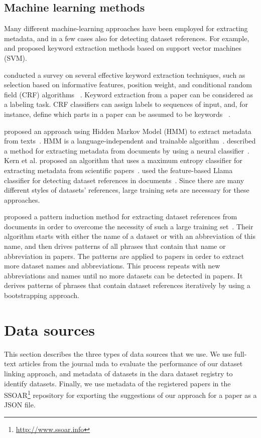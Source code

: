 \documentclass{IOS-Book-Article}
\newcommand{\dara}{\textsf{da\textbar ra}}
\begin{document}
\subsection{Machine learning methods}
Many different machine-learning approaches have been employed for extracting metadata, and in a few cases also for detecting dataset references. For example, \citeauthor{Zhang2006} \citeyearpar{Zhang2006} and \citeauthor{Han2003} \citeyearpar{Han2003} proposed keyword extraction methods based on support vector machines (SVM). 

\citeauthor{Kaur2010} conducted a survey on several effective keyword extraction techniques, such as selection based on informative features, position weight, and conditional random field (CRF) algorithms ~\citeyearpar{Kaur2010}. Keyword extraction from a paper can be considered as a labeling task. CRF classifiers can assign labels to sequences of input, and, for instance, define which parts in a paper can be assumed to be keywords ~\citep{ZHANG2008}.

\citeauthor{Cui2010} proposed an approach using Hidden Markov Model (HMM) to extract metadata from texts~\citeyearpar{Cui2010}. HMM is a language-independent and trainable algorithm~\cite{Kubala1998}. \citeauthor{Marinai2009} described a method for extracting metadata from documents by using a neural classifier~\citeyearpar{Marinai2009}. Kern et al. proposed an algorithm that uses a maximum entropy classifier for extracting metadata from scientific papers~\cite{Kern2012}. \citeauthor{MeiyuLu2012} used the feature-based Llama classifier for detecting dataset references in documents~\citeyearpar{MeiyuLu2012}. Since there are many different styles of datasets' references, large training sets are necessary for these approaches.

\citeauthor{Boland2012} proposed a pattern induction method for extracting dataset references from documents in order to overcome the necessity of such a large training set~\citeyearpar{Boland2012}. Their algorithm starts with either the name of a dataset or with an abbreviation of this name, and then drives patterns of all phrases that contain that name or abbreviation in papers. The patterns are applied to papers in order to extract more dataset names and abbreviations. This process repeats with new abbreviations and names until no more datasets can be detected in papers. It derives patterns of phrases that contain dataset references iteratively by using a bootstrapping approach.

\section{Data sources}
\label{sec:data}
This section describes the three types of data sources that we use. We use full-text articles from the journal mda to evaluate the performance of our dataset linking approach, and metadata of datasets in the {\dara} dataset registry to identify datasets. Finally, we use metadata of the registered papers in the SSOAR\footnote{\url{http://www.ssoar.info}} repository for exporting the suggestions of our approach for a paper as a JSON file. 
\end{document}
